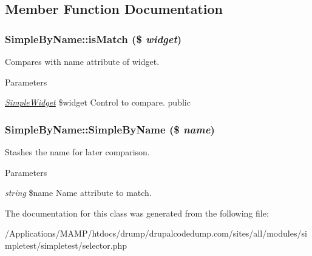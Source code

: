 \subsection{Member Function Documentation}
\hypertarget{class_simple_by_name_aa1a59df058107988656ed56f84954160}{
\subsubsection[{isMatch}]{\setlength{\rightskip}{0pt plus 5cm}SimpleByName::isMatch (\$ {\em widget})}}
\label{class_simple_by_name_aa1a59df058107988656ed56f84954160}
Compares with name attribute of widget. 
\begin{DoxyParams}{Parameters}
\item[{\em \hyperlink{class_simple_widget}{SimpleWidget}}]\$widget Control to compare.  public \end{DoxyParams}
\hypertarget{class_simple_by_name_ab0987827dd39bdcc4ed7cd3cd8f5b1ac}{
\subsubsection[{SimpleByName}]{\setlength{\rightskip}{0pt plus 5cm}SimpleByName::SimpleByName (\$ {\em name})}}
\label{class_simple_by_name_ab0987827dd39bdcc4ed7cd3cd8f5b1ac}
Stashes the name for later comparison. 
\begin{DoxyParams}{Parameters}
\item[{\em string}]\$name Name attribute to match. \end{DoxyParams}


The documentation for this class was generated from the following file:\begin{DoxyCompactItemize}
\item 
/Applications/MAMP/htdocs/drump/drupalcodedump.com/sites/all/modules/simpletest/simpletest/selector.php\end{DoxyCompactItemize}
